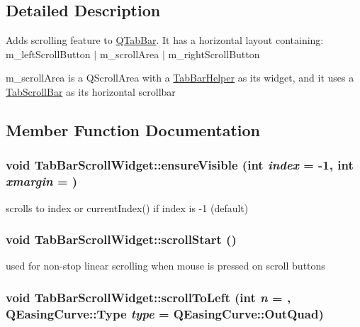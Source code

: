 \subsection{Detailed Description}
Adds scrolling feature to \hyperlink{class_q_tab_bar}{QTabBar}. It has a horizontal layout containing: m\_\-leftScrollButton $|$ m\_\-scrollArea $|$ m\_\-rightScrollButton

m\_\-scrollArea is a QScrollArea with a \hyperlink{class_tab_bar_helper}{TabBarHelper} as its widget, and it uses a \hyperlink{class_tab_scroll_bar}{TabScrollBar} as its horizontal scrollbar 

\subsection{Member Function Documentation}
\hypertarget{class_tab_bar_scroll_widget_a05bdaea447574f7fb718cd353e98400b}{
\subsubsection[{ensureVisible}]{\setlength{\rightskip}{0pt plus 5cm}void TabBarScrollWidget::ensureVisible (int {\em index} = {\ttfamily -\/1}, \/  int {\em xmargin} = {})}}
\label{class_tab_bar_scroll_widget_a05bdaea447574f7fb718cd353e98400b}


scrolls to index or currentIndex() if index is -\/1 (default) 

\hypertarget{class_tab_bar_scroll_widget_a05a239bfcf3fe7853b75dd8366132406}{
\subsubsection[{scrollStart}]{\setlength{\rightskip}{0pt plus 5cm}void TabBarScrollWidget::scrollStart ()}}
\label{class_tab_bar_scroll_widget_a05a239bfcf3fe7853b75dd8366132406}


used for non-\/stop linear scrolling when mouse is pressed on scroll buttons 

\hypertarget{class_tab_bar_scroll_widget_a525f4d6a01724eab689c59e35a134789}{
\subsubsection[{scrollToLeft}]{\setlength{\rightskip}{0pt plus 5cm}void TabBarScrollWidget::scrollToLeft (int {\em n} = {}, \/  QEasingCurve::Type {\em type} = {\ttfamily QEasingCurve::OutQuad})}}
\label{class_tab_bar_scroll_widget_a525f4d6a01724eab689c59e35a134789}


